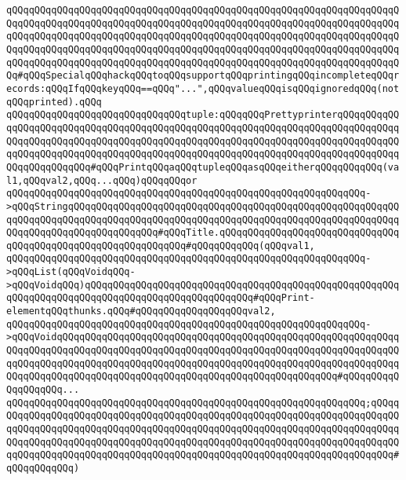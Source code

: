 \verb|qQQqqQQqqQQqqQQqqQQqqQQqqQQqqQQqqQQqqQQqqQQqqQQqqQQqqQQqqQQqqQQqqQQqqQQqqQQqqQQqqQQqqQQqqQQqqQQqqQQqqQQqqQQqqQQqqQQqqQQqqQQqqQQqqQQqqQQqqQQqqQQqqQQqqQQqqQQqqQQqqQQqqQQqqQQqqQQqqQQqqQQqqQQqqQQqqQQqqQQqqQQqqQQqqQQqqQQqqQQqqQQqqQQqqQQqqQQqqQQqqQQqqQQqqQQqqQQqqQQqqQQqqQQqqQQqqQQqqQQqqQQqqQQqqQQqqQQqqQQqqQQqqQQqqQQqqQQqqQQqqQQqqQQqqQQqqQQqqQQqqQQqqQQqqQQq#qQQqSpecialqQQqhackqQQqtoqQQqsupportqQQqprintingqQQqincompleteqQQqrecords:qQQqIfqQQqkeyqQQq==qQQq"...",qQQqvalueqQQqisqQQqignoredqQQq(notqQQqprinted).qQQq|\newline
\newline
\verb|qQQqqQQqqQQqqQQqqQQqqQQqqQQqqQQqtuple:qQQqqQQqPrettyprinterqQQqqQQqqQQqqQQqqQQqqQQqqQQqqQQqqQQqqQQqqQQqqQQqqQQqqQQqqQQqqQQqqQQqqQQqqQQqqQQqqQQqqQQqqQQqqQQqqQQqqQQqqQQqqQQqqQQqqQQqqQQqqQQqqQQqqQQqqQQqqQQqqQQqqQQqqQQqqQQqqQQqqQQqqQQqqQQqqQQqqQQqqQQqqQQqqQQqqQQqqQQqqQQqqQQqqQQqqQQqqQQqqQQqqQQqqQQq#qQQqPrintqQQqaqQQqtupleqQQqasqQQqeitherqQQqqQQqqQQq(val1,qQQqval2,qQQq...qQQq)qQQqqQQqor|\newline
\verb|qQQqqQQqqQQqqQQqqQQqqQQqqQQqqQQqqQQqqQQqqQQqqQQqqQQqqQQqqQQqqQQq->qQQqStringqQQqqQQqqQQqqQQqqQQqqQQqqQQqqQQqqQQqqQQqqQQqqQQqqQQqqQQqqQQqqQQqqQQqqQQqqQQqqQQqqQQqqQQqqQQqqQQqqQQqqQQqqQQqqQQqqQQqqQQqqQQqqQQqqQQqqQQqqQQqqQQqqQQqqQQqqQQq#qQQqTitle.qQQqqQQqqQQqqQQqqQQqqQQqqQQqqQQqqQQqqQQqqQQqqQQqqQQqqQQqqQQqqQQq#qQQqqQQqqQQq(qQQqval1,|\newline
\verb|qQQqqQQqqQQqqQQqqQQqqQQqqQQqqQQqqQQqqQQqqQQqqQQqqQQqqQQqqQQqqQQq->qQQqList(qQQqVoidqQQq->qQQqVoidqQQq)qQQqqQQqqQQqqQQqqQQqqQQqqQQqqQQqqQQqqQQqqQQqqQQqqQQqqQQqqQQqqQQqqQQqqQQqqQQqqQQqqQQqqQQqqQQqqQQqqQQq#qQQqPrint-elementqQQqthunks.qQQq#qQQqqQQqqQQqqQQqqQQqval2,|\newline
\verb|qQQqqQQqqQQqqQQqqQQqqQQqqQQqqQQqqQQqqQQqqQQqqQQqqQQqqQQqqQQqqQQq->qQQqVoidqQQqqQQqqQQqqQQqqQQqqQQqqQQqqQQqqQQqqQQqqQQqqQQqqQQqqQQqqQQqqQQqqQQqqQQqqQQqqQQqqQQqqQQqqQQqqQQqqQQqqQQqqQQqqQQqqQQqqQQqqQQqqQQqqQQqqQQqqQQqqQQqqQQqqQQqqQQqqQQqqQQqqQQqqQQqqQQqqQQqqQQqqQQqqQQqqQQqqQQqqQQqqQQqqQQqqQQqqQQqqQQqqQQqqQQqqQQqqQQqqQQqqQQqqQQqqQQqqQQq#qQQqqQQqqQQqqQQqqQQq...|\newline
\verb|qQQqqQQqqQQqqQQqqQQqqQQqqQQqqQQqqQQqqQQqqQQqqQQqqQQqqQQqqQQqqQQq;qQQqqQQqqQQqqQQqqQQqqQQqqQQqqQQqqQQqqQQqqQQqqQQqqQQqqQQqqQQqqQQqqQQqqQQqqQQqqQQqqQQqqQQqqQQqqQQqqQQqqQQqqQQqqQQqqQQqqQQqqQQqqQQqqQQqqQQqqQQqqQQqqQQqqQQqqQQqqQQqqQQqqQQqqQQqqQQqqQQqqQQqqQQqqQQqqQQqqQQqqQQqqQQqqQQqqQQqqQQqqQQqqQQqqQQqqQQqqQQqqQQqqQQqqQQqqQQqqQQqqQQqqQQqqQQqqQQqqQQqqQQq#qQQqqQQqqQQq)|\newline
\newline
